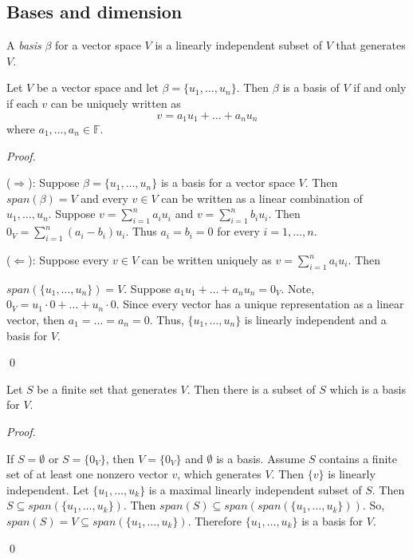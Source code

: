 \documentclass[12pt]{article}
\newenvironment{theorem}[2][Theorem]{\begin{trivlist}
\item[\hskip \labelsep {\bfseries #1}\hskip \labelsep {\bfseries #2.}]}{\end{trivlist}}
\newenvironment{definition}[2][Definition]{\begin{trivlist}
\item[\hskip \labelsep {\bfseries #1}\hskip \labelsep {\bfseries #2}]}{\end{trivlist}}
\newenvironment{sol}
    {\emph{Proof.}
    }
    {
    \qed
    }
\begin{document}
\subsection{Bases and dimension}

\begin{definition}{8}
A \textit{basis} $\beta$ for a vector space $V$ is a linearly independent subset of $V$ that generates $V$.
\end{definition}

\begin{theorem}{1.8}
Let $V$ be a vector space and let $\beta = \{u_1, \dots, u_n\}$. Then $\beta$ is a basis of $V$ if and only if each $v$ can be uniquely written as $$v = a_1u_1 + \dots + a_nu_n$$ where $a_1, \dots, a_n \in \mathbb{F}$.
\end{theorem}

\begin{sol}
($\Longrightarrow$): Suppose $\beta = \{u_1, \dots, u_n\}$ is a basis for a vector space $V$. Then $span(\beta) = V$ and every $v \in V$ can be written as a linear combination of $u_1, \dots, u_n$. Suppose $v = \sum_{i = 1}^na_iu_i$ and $v = \sum_{i = 1}^nb_iu_i$. Then $0_V = \sum_{i = 1}^n(a_i - b_i)u_i$. Thus $a_i = b_i = 0$ for every $i = 1, \dots, n$.

($\Longleftarrow$): Suppose every $v \in V$ can be written uniquely as $v = \sum_{i = 1}^na_iu_i$. Then 

\noindent$span(\{u_1, \dots, u_n\}) = V$. Suppose $a_1u_1 + \dots + a_nu_n = 0_V$. Note, $0_V = u_1 \cdot 0 + \dots + u_n \cdot 0$. Since every vector has a unique representation as a linear vector, then $a_1 = \dots = a_n = 0$. Thus, $\{u_1, \dots, u_n\}$ is linearly independent and a basis for $V$.
\end{sol}

\begin{theorem}{1.9}
Let $S$ be a finite set that generates $V$. Then there is a subset of $S$ which is a basis for $V$.
\end{theorem}

\begin{sol}
If $S = \emptyset$ or $S = \{0_V\}$, then $V = \{0_V\}$ and $\emptyset$ is a basis. Assume $S$ contains a finite set of at least one nonzero vector $v$, which generates $V$. Then $\{v\}$ is linearly independent. Let $\{u_1, \dots, u_k\}$ is a maximal linearly independent subset of $S$. Then $S \subseteq span(\{u_1, \dots, u_k\})$. Then $span(S) \subseteq span(span(\{u_1, \dots, u_k\}))$. So, $span(S) = V \subseteq span(\{u_1, \dots, u_k\})$. Therefore $\{u_1, \dots, u_k\}$ is a basis for $V$.
\end{sol}
\end{document}
